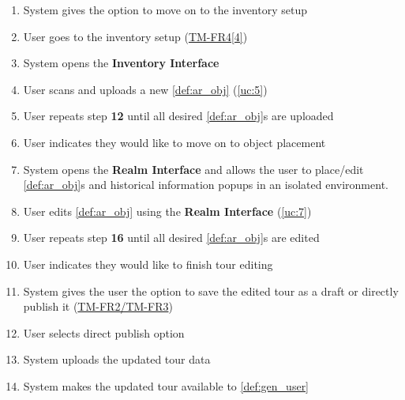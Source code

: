 \documentclass{article}
\begin{document}
\begin{enumerate}[label=\textbf{UC\arabic*}]
\begin{enumerate}[label=\textbf{\arabic*.}]
              \item System gives the option to move on to the inventory setup
              \item User goes to the inventory setup (\hyperref[ssub:tour_management]{TM-FR4[4]})
              \item System opens the \textbf{Inventory Interface}
              \item User scans and uploads a new \ref{def:ar_obj} (\ref{uc:5})
              \item User repeats step \textbf{12} until all desired \ref{def:ar_obj}s are uploaded
              \item User indicates they would like to move on to object placement
              \item System opens the \textbf{Realm Interface} and allows the user to place/edit \ref{def:ar_obj}s and historical information popups in an isolated environment.
              \item User edits \ref{def:ar_obj} using the \textbf{Realm Interface} (\ref{uc:7})
              \item User repeats step \textbf{16} until all desired \ref{def:ar_obj}s are edited
              \item User indicates they would like to finish tour editing
              \item System gives the user the option to save the edited tour as a draft or directly publish it (\hyperref[ssub:tour_management]{TM-FR2/TM-FR3})
              \item User selects direct publish option
              \item System uploads the updated tour data
              \item System makes the updated tour available to \ref{def:gen_user}
          \end{enumerate}


\end{enumerate}
\end{document}
